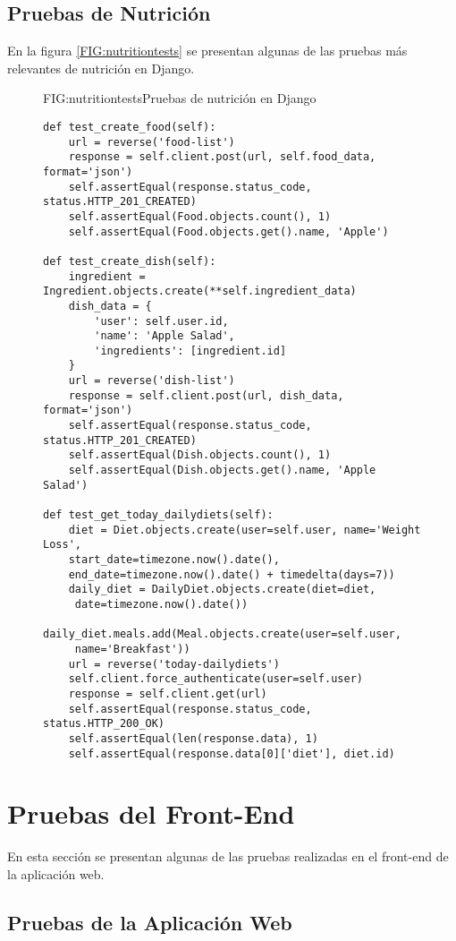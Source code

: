 \subsection{Pruebas de Nutrición}
En la figura \ref{FIG:nutritiontests} se presentan algunas de las pruebas más relevantes de nutrición en Django.
\begin{figure}[Pruebas de Nutrición]{FIG:nutritiontests}{Pruebas de nutrición en Django}
    \begin{verbatim}
def test_create_food(self):
    url = reverse('food-list')
    response = self.client.post(url, self.food_data, format='json')
    self.assertEqual(response.status_code, status.HTTP_201_CREATED)
    self.assertEqual(Food.objects.count(), 1)
    self.assertEqual(Food.objects.get().name, 'Apple')

def test_create_dish(self):
    ingredient = Ingredient.objects.create(**self.ingredient_data)
    dish_data = {
        'user': self.user.id,
        'name': 'Apple Salad',
        'ingredients': [ingredient.id]
    }
    url = reverse('dish-list')
    response = self.client.post(url, dish_data, format='json')
    self.assertEqual(response.status_code, status.HTTP_201_CREATED)
    self.assertEqual(Dish.objects.count(), 1)
    self.assertEqual(Dish.objects.get().name, 'Apple Salad')

def test_get_today_dailydiets(self):
    diet = Diet.objects.create(user=self.user, name='Weight Loss', 
    start_date=timezone.now().date(), 
    end_date=timezone.now().date() + timedelta(days=7))
    daily_diet = DailyDiet.objects.create(diet=diet,
     date=timezone.now().date())
    daily_diet.meals.add(Meal.objects.create(user=self.user,
     name='Breakfast'))
    url = reverse('today-dailydiets')
    self.client.force_authenticate(user=self.user)
    response = self.client.get(url)
    self.assertEqual(response.status_code, status.HTTP_200_OK)
    self.assertEqual(len(response.data), 1)
    self.assertEqual(response.data[0]['diet'], diet.id)
    \end{verbatim}
    \end{figure}

\newpage

\section{Pruebas del Front-End\label{SEC:PRUEBASFRONTEND}}
En esta sección se presentan algunas de las pruebas realizadas en el front-end de la aplicación web.

\subsection{Pruebas de la Aplicación Web}
